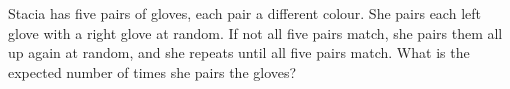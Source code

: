 Stacia has five pairs of gloves, each pair a different colour. She pairs each left glove with a right glove at random. If not all five pairs match, she pairs them all up again at random, and she repeats until all five pairs match. What is the expected number of times she pairs the gloves?

